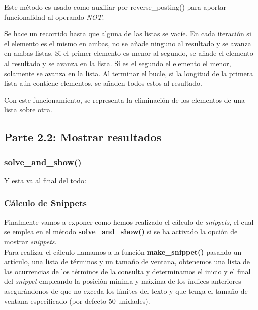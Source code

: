 \documentclass[12pt,a4paper]{article}
\begin{document}
Este método es usado como auxiliar por reverse\_posting() para aportar funcionalidad al operando \textit{NOT}.

Se hace un recorrido hasta que alguna de las listas se vacíe. En cada iteración si el elemento es el mismo en ambas, no se añade ninguno al resultado y se avanza en ambas listas. Si el primer elemento es menor al segundo, se añade el elemento al resultado y se avanza en la lista. Si es el segundo el elemento el menor, solamente se avanza en la lista. Al terminar el bucle, si la longitud de la primera lista aún contiene elementos, se añaden todos estos al resultado.

Con este funcionamiento, se representa la eliminación de los elementos de una lista sobre otra.

\subsection{Parte 2.2: Mostrar resultados}
\subsubsection{solve\_and\_show()}

Y esta va al final del todo:

\subsubsection{Cálculo de Snippets}
Finalmente vamos a exponer como hemos realizado el cálculo de \textit{snippets}, el cual se emplea en el método \textbf{solve\_and\_show() } si se ha activado la opción de mostrar \textit{snippets}.\\
Para realizar el cálculo llamamos a la función \textbf{make\_snippet()} pasando un artículo, una lista de términos y un tamaño de ventana, obtenemos una lista de las ocurrencias de los términos de la consulta y determinamos el inicio y el final del \textit{snippet} empleando la posición mínima y máxima de los índices anteriores asegurándonos de que no exceda los límites del texto y que tenga el tamaño de ventana especificado (por defecto 50 unidades).
\end{document}
